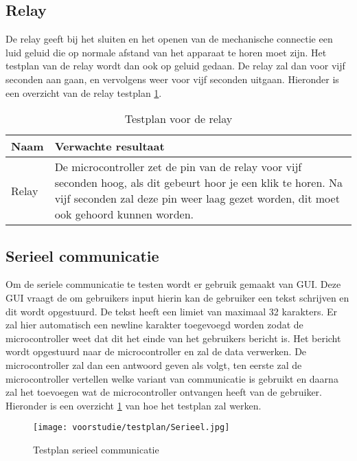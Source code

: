 \subsection{Relay}
De relay geeft bij het sluiten en het openen van de mechanische connectie een luid geluid die op normale afstand van het apparaat te horen moet zijn. Het testplan van de relay wordt dan ook op geluid gedaan. De relay zal dan voor vijf seconden aan gaan, en vervolgens weer voor vijf seconden uitgaan. Hieronder is een overzicht van de relay testplan \ref{tab:hw_val_relay_testplan}.

\begin{table}[h!]
	\caption{Testplan voor de relay}
	\begin{tabular}{lp{14.5cm}}
	\toprule
	\textbf{Naam} 	& \textbf{Verwachte resultaat} \\ \toprule
	Relay			& De microcontroller zet de pin van de relay voor vijf seconden hoog, als dit gebeurt hoor je een klik te horen. Na vijf seconden zal deze pin weer laag gezet worden, dit moet ook gehoord kunnen worden.\\  \bottomrule
	\end{tabular}
	\label{tab:hw_val_relay_testplan}
\end{table}


\subsection{Serieel communicatie}
Om de seriele communicatie te testen wordt er gebruik gemaakt van GUI. Deze GUI vraagt de om gebruikers input hierin kan de gebruiker een tekst schrijven en dit wordt opgestuurd. De tekst heeft een limiet van maximaal 32 karakters. Er zal hier automatisch een newline karakter toegevoegd worden zodat de microcontroller weet dat dit het einde van het gebruikers bericht is. Het bericht wordt opgestuurd naar de microcontroller en zal de data verwerken. De microcontroller zal dan een antwoord geven als volgt, ten eerste zal de microcontroller vertellen welke variant van communicatie is gebruikt en daarna zal het toevoegen wat de microcontroller ontvangen heeft van de gebruiker. Hieronder is een overzicht \ref{fig:testplanserieel} van hoe het testplan zal werken.

\begin{figure}[h!]
	\centering

	\label{fig:testplanserieel}
	\texttt{[image: voorstudie/testplan/Serieel.jpg]}
	\caption{Testplan serieel communicatie}
\end{figure}

